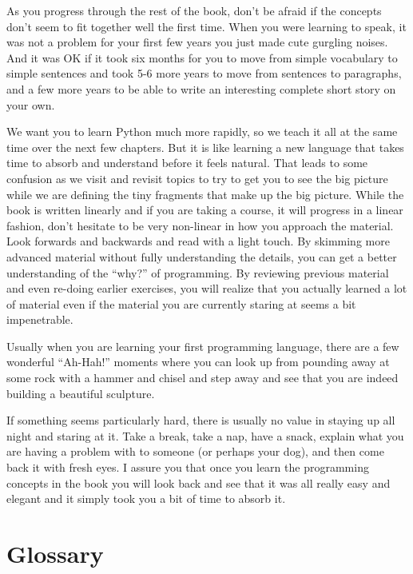 \documentclass[11pt]{book}
\begin{document}
As you progress through the rest of the book, don't be afraid if the concepts 
don't seem to fit together well the first time.  When you were learning to speak, 
it was not a problem  for your first few years you just made cute gurgling noises.
And it was OK if it took six months for you to move from simple vocabulary to 
simple sentences and took 5-6 more years to move from sentences to paragraphs, and a
few more years to be able to write an interesting complete short story on your own.

We want you to learn Python much more rapidly, so we teach it all at the same time
over the next few chapters.  
But it is like learning a new language that takes time to absorb and understand
before it feels natural.
That leads to some confusion as we visit and revisit
topics to try to get you to see the big picture while we are defining the tiny
fragments that make up the big picture.  While the book is written linearly and
if you are taking a course, it will progress in a linear fashion, don't hesitate
to be very non-linear in how you approach the material.  Look forwards and backwards
and read with a light touch.  By skimming more advanced material without 
fully understanding the details, you can get a better understanding of the ``why?'' 
of programming.  By reviewing previous material and even re-doing earlier 
exercises, you will realize that you actually learned a lot of material even 
if the material you are currently staring at seems a bit impenetrable.

Usually when you are learning your first programming language, there are a few
wonderful ``Ah-Hah!'' moments where you can look up from pounding away at some rock
with a hammer and chisel and step away and see that you are indeed building 
a beautiful sculpture.

If something seems particularly hard, there is usually no value in staying up all 
night and staring at it.   Take a break, take a nap, have a snack, explain what you 
are having a problem with to someone (or perhaps your dog), and then come back it with
fresh eyes.  I assure you that once you learn the programming concepts in the book
you will look back and see that it was all really easy and elegant and it simply 
took you a bit of time to absorb it.

\section{Glossary}
\end{document}
